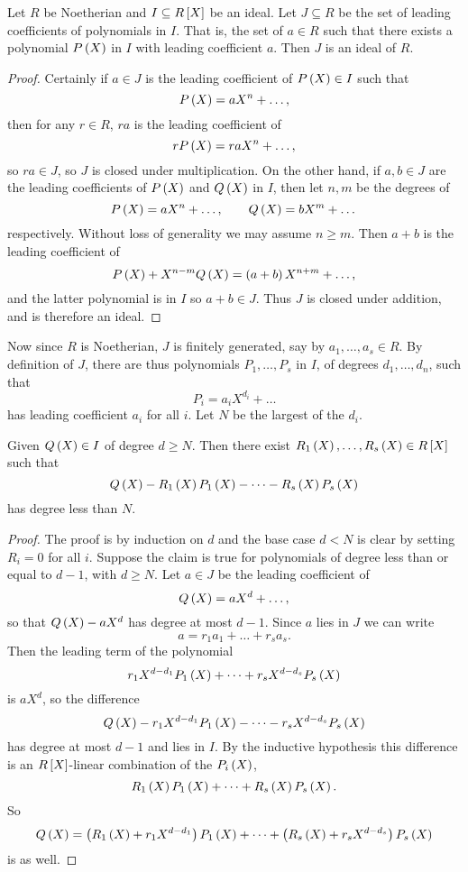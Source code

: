 \begin{lemma}
Let $ R $ be Noetherian and $ I \subseteq R\sb{X} $ be an ideal. Let $ J \subseteq R $ be the set of leading coefficients of polynomials in $ I $. That is, the set of $ a \in R $ such that there exists a polynomial $ P\rb{X} $ in $ I $ with leading coefficient $ a $. Then $ J $ is an ideal of $ R $.
\end{lemma}

\begin{proof}
Certainly if $ a \in J $ is the leading coefficient of $ P\rb{X} \in I $ such that
$$ P\rb{X} = aX^n + \dots, $$
then for any $ r \in R $, $ ra $ is the leading coefficient of
$$ rP\rb{X} = raX^n + \dots, $$
so $ ra \in J $, so $ J $ is closed under multiplication. On the other hand, if $ a, b \in J $ are the leading coefficients of $ P\rb{X} $ and $ Q\rb{X} $ in $ I $, then let $ n, m $ be the degrees of
$$ P\rb{X} = aX^n + \dots, \qquad Q\rb{X} = bX^m + \dots $$
respectively. Without loss of generality we may assume $ n \ge m $. Then $ a + b $ is the leading coefficient of
$$ P\rb{X} + X^{n - m}Q\rb{X} = \rb{a + b}X^{n + m} + \dots, $$
and the latter polynomial is in $ I $ so $ a + b \in J $. Thus $ J $ is closed under addition, and is therefore an ideal.
\end{proof}

\pagebreak

Now since $ R $ is Noetherian, $ J $ is finitely generated, say by $ a_1, \dots, a_s \in R $. By definition of $ J $, there are thus polynomials $ P_1, \dots, P_s $ in $ I $, of degrees $ d_1, \dots, d_n $, such that
$$ P_i = a_iX^{d_i} + \dots $$
has leading coefficient $ a_i $ for all $ i $. Let $ N $ be the largest of the $ d_i $.

\begin{lemma}
Given $ Q\rb{X} \in I $ of degree $ d \ge N $. Then there exist $ R_1\rb{X}, \dots, R_s\rb{X} \in R\sb{X} $ such that
$$ Q\rb{X} - R_1\rb{X}P_1\rb{X} - \dots - R_s\rb{X}P_s\rb{X} $$
has degree less than $ N $.
\end{lemma}

\begin{proof}
The proof is by induction on $ d $ and the base case $ d < N $ is clear by setting $ R_i = 0 $ for all $ i $. Suppose the claim is true for polynomials of degree less than or equal to $ d - 1 $, with $ d \ge N $. Let $ a \in J $ be the leading coefficient of
$$ Q\rb{X} = aX^d + \dots, $$
so that $ Q\rb{X} - aX^d $ has degree at most $ d - 1 $. Since $ a $ lies in $ J $ we can write
$$ a = r_1a_1 + \dots + r_sa_s. $$
Then the leading term of the polynomial
$$ r_1X^{d - d_1}P_1\rb{X} + \dots + r_sX^{d - d_s}P_s\rb{X} $$
is $ aX^d $, so the difference
$$ Q\rb{X} - r_1X^{d - d_1}P_1\rb{X} - \dots - r_sX^{d - d_s}P_s\rb{X} $$
has degree at most $ d - 1 $ and lies in $ I $. By the inductive hypothesis this difference is an $ R\sb{X} $-linear combination of the $ P_i\rb{X} $,
$$ R_1\rb{X}P_1\rb{X} + \dots + R_s\rb{X}P_s\rb{X}. $$
So
$$ Q\rb{X} = \rb{R_1\rb{X} + r_1X^{d - d_1}}P_1\rb{X} + \dots + \rb{R_s\rb{X} + r_sX^{d - d_s}}P_s\rb{X} $$
is as well.
\end{proof}

